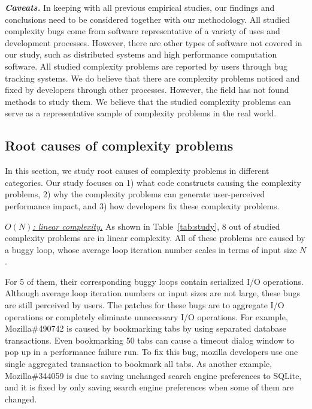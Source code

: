 {\bf{\textit{Caveats.}}}
In keeping with all previous empirical studies, 
our findings and conclusions need to be considered together with our methodology.
All studied complexity bugs come from software representative of a variety of uses and development processes. 
However, there are other types of software not covered in our study, 
such as distributed systems and high performance computation software. 
All studied complexity problems are reported by users through bug tracking systems.  
We do believe that there are complexity problems noticed 
and fixed by developers through other processes. 
However, the field has not found methods to study them.
We believe that the studied complexity problems can serve as a representative sample
of complexity problems in the real world. 


\subsection{Root causes of complexity problems}
\label{sec:tax}



In this section, we study root causes of complexity problems in different categories. 
Our study focuses on 
1) what code constructs causing the complexity problems, 
2) why the complexity problems can generate user-perceived performance impact, 
and 3) how developers fix these complexity problems. 


{\underline{\textit{$O(N)$: linear complexity.}}} 
As shown in Table~\ref{tab:study}, 
8 out of \ComBugs studied complexity problems are in linear complexity. 
All of these problems are caused by a buggy loop, 
whose average loop iteration number scales in terms of input size $N$.

For 5 of them, their corresponding buggy loops contain serialized I/O operations.
Although average loop iteration numbers or input sizes are not large,
these bugs are still perceived by users.
The patches for these bugs are to aggregate I/O operations 
or completely eliminate unnecessary I/O operations.   
For example, Mozilla\#490742 is caused by bookmarking tabs 
by using separated database transactions. 
Even bookmarking 50 tabs can cause a timeout dialog window to pop up 
in a performance failure run.
To fix this bug, mozilla developers use one single aggregated transaction 
to bookmark all tabs.
As another example, Mozilla\#344059 is due to saving unchanged 
search engine preferences to SQLite, 
and it is fixed by only saving search 
engine preferences when some of them are changed.

